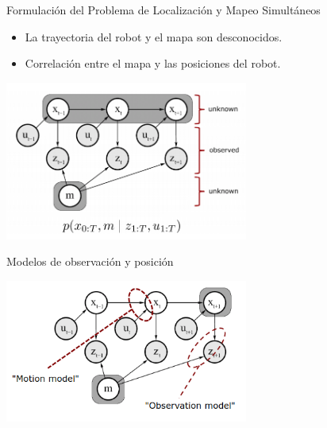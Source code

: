 \documentclass[
  24pt, %
  aspectratio=169, %
]{beamer}
\begin{document}
\begin{frame}{Formulación del Problema de Localización y Mapeo Simultáneos}

  \begin{itemize}
  \item La trayectoria del robot y el mapa son desconocidos.
  \item Correlación entre el mapa y las posiciones del robot. 
  \end{itemize}

  \centering

  \includegraphics[width=8cm]{slam2}

\end{frame}

\begin{frame}{Modelos de observación y posición}

  \centering

  \includegraphics[width=8cm]{slam3}

\end{frame}
\end{document}
